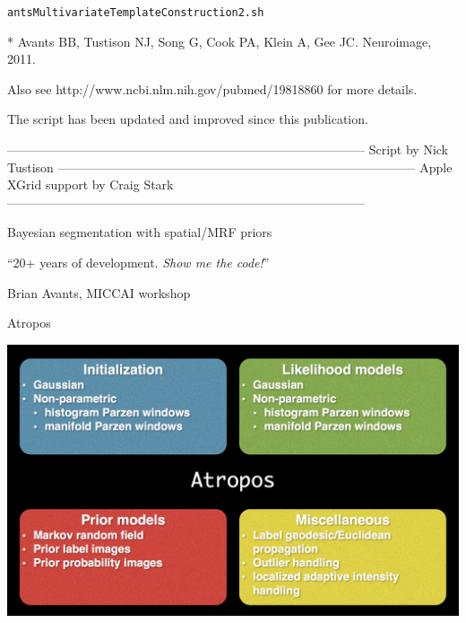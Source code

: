 \documentclass[ignorenonframetext,]{beamer}
\newenvironment{Shaded}{\begin{snugshade}}{\end{snugshade}}
\newcommand{\StringTok}[1]{\textcolor[rgb]{0.31,0.60,0.02}{{#1}}}
\begin{document}
\begin{frame}[fragile]{\texttt{antsMultivariateTemplateConstruction2.sh}}
\begin{Shaded}
\begin{Highlighting}[]
\StringTok{* Avants BB, Tustison NJ, Song G, Cook PA, Klein A, Gee JC. Neuroimage, 2011.}

\StringTok{Also see http://www.ncbi.nlm.nih.gov/pubmed/19818860 for more details.}

\StringTok{The script has been updated and improved since this publication.}

\StringTok{--------------------------------------------------------------------------------------}
\StringTok{Script by Nick Tustison}
\StringTok{--------------------------------------------------------------------------------------}
\StringTok{Apple XGrid support by Craig Stark}
\StringTok{--------------------------------------------------------------------------------------}
\end{Highlighting}
\end{Shaded}

\end{frame}

\begin{frame}{Bayesian segmentation with spatial/MRF priors}

\end{frame}

\begin{frame}{``20+ years of development. \emph{Show me the code!}''}

Brian Avants, MICCAI workshop

\end{frame}

\begin{frame}{Atropos}

\includegraphics{./Figs/atropos.png}

\end{frame}
\end{document}
